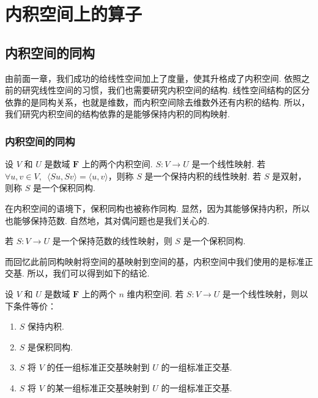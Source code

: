 \chapter{内积空间上的算子}

\section{内积空间的同构}

由前面一章，我们成功的给线性空间加上了度量，使其升格成了内积空间. 依照之前的研究线性空间的习惯，我们也需要研究内积空间的结构. 线性空间结构的区分依靠的是同构关系，也就是维数，而内积空间除去维数外还有内积的结构. 所以，我们研究内积空间的结构依靠的是能够保持内积的同构映射.

\subsection{内积空间的同构}

\begin{definition}
    设 $ V $ 和 $ U $ 是数域 $ \mathbf{F} $ 上的两个内积空间. $ S: V \rightarrow U $ 是一个线性映射. 若 $ \forall u, v \in V,\enspace \langle Su, Sv \rangle = \langle u, v \rangle $，则称 $ S $ 是一个保持内积的线性映射. 若 $ S $ 是双射，则称 $ S $ 是一个保积同构.
\end{definition}

在内积空间的语境下，保积同构也被称作同构. 显然，因为其能够保持内积，所以也能够保持范数. 自然地，其对偶问题也是我们关心的.

\begin{theorem}
    若 $ S : V \rightarrow U $ 是一个保持范数的线性映射，则 $ S $ 是一个保积同构.
\end{theorem}

而回忆此前同构映射将空间的基映射到空间的基，内积空间中我们使用的是标准正交基. 所以，我们可以得到如下的结论.

\begin{theorem}
    设 $ V $ 和 $ U $ 是数域 $ \mathbf{F} $ 上的两个 $ n $ 维内积空间. 若 $ S : V \rightarrow U $ 是一个线性映射，则以下条件等价：
    \begin{enumerate}
        \item $ S $ 保持内积.
        \item $ S $ 是保积同构.
        \item $ S $ 将 $ V $ 的任一组标准正交基映射到 $ U $ 的一组标准正交基.
        \item $ S $ 将 $ V $ 的某一组标准正交基映射到 $ U $ 的一组标准正交基.
    \end{enumerate}
\end{theorem}

